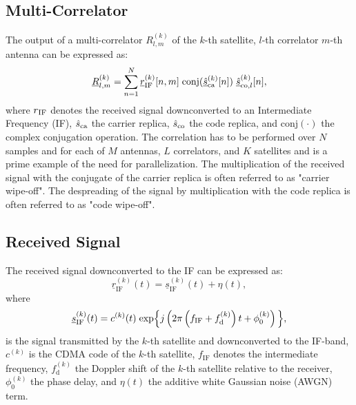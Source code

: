 \documentclass{juliacon}
\begin{document}
\subsection*{Multi-Correlator}\label{sub:multi-correlator}
The output of a multi-correlator $R^{(k)}_{l,m}$ of the $k$-th satellite, $l$-th correlator $m$-th antenna can be expressed as:
\begin{equation}\label{eqn:multi-correlator}
    \underline{R}^{(k)}_{l,m} = \sum^N_{n=1} \underline{r}^{(k)}_{\mathrm{IF}}[n, m] \hspace{1mm} \mathrm{conj}(\underline{\hat{s}}^{(k)}_{\mathrm{ca}}[n]) \hspace{1mm} \underline{\hat{s}}_{\mathrm{co}, l}^{(k)}[n] ,
\end{equation}
where $r\textsubscript{IF}$ denotes the received signal downconverted to an Intermediate Frequency (IF), $\hat{s}\textsubscript{ca}$ the carrier replica, $\hat{s}\textsubscript{co}$ the code replica, and $\mathrm{conj}(\cdot)$ the complex conjugation operation. The correlation has to be performed over $N$ samples and for each of $M$ antennas, $L$ correlators, and $K$ satellites and is a prime example of the need for parallelization. The multiplication of the received signal with the conjugate of the carrier replica is often referred to as "carrier wipe-off". The despreading of the signal by multiplication with the code replica is often referred to as "code wipe-off".

\subsection*{Received Signal}\label{sec:received-signal}
The received signal downconverted to the IF can be expressed as:
\begin{equation}\label{eqn:received-signal}
    \underline{r}^{(k)}_{\mathrm{IF}}(t)=\underline{s}_{\mathrm{IF}}^{(k)}(t)+\eta(t),
\end{equation}
where
\begin{equation}
    \underline{s}_{\mathrm{IF}}^{(k)}(t)=c^{(k)}(t) \hspace{1mm} \mathrm{exp}\Big\{j\left(2 \pi\left(f_{\mathrm{IF}}+f^{(k)}_{\mathrm{d}}\right) t+\phi^{(k)}_{0}\right)\Big\},
\end{equation}
is the signal transmitted by the $k$-th satellite and downconverted to the IF-band, $c^{(k)}$ is the CDMA code of the $k$-th satellite, $f_{\mathrm{IF}}$ denotes the intermediate frequency, $f^{(k)}_{\mathrm{d}}$ the Doppler shift of the $k$-th satellite relative to the receiver, $\phi^{(k)}_0$ the phase delay, and $\eta(t)$ the additive white Gaussian noise (AWGN) term.
\end{document}
